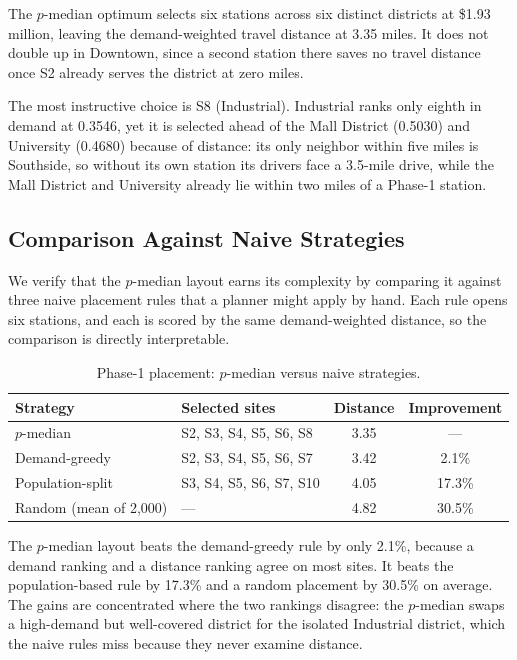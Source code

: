 \documentclass[11pt]{article}
\begin{document}
The $p$-median optimum selects six stations across six distinct districts at \$1.93 million, leaving the demand-weighted travel distance at 3.35 miles. It does not double up in Downtown, since a second station there saves no travel distance once S2 already serves the district at zero miles.

The most instructive choice is S8 (Industrial). Industrial ranks only eighth in demand at 0.3546, yet it is selected ahead of the Mall District (0.5030) and University (0.4680) because of distance: its only neighbor within five miles is Southside, so without its own station its drivers face a 3.5-mile drive, while the Mall District and University already lie within two miles of a Phase-1 station.

\subsection{Comparison Against Naive Strategies}

We verify that the $p$-median layout earns its complexity by comparing it against three naive placement rules that a planner might apply by hand. Each rule opens six stations, and each is scored by the same demand-weighted distance, so the comparison is directly interpretable.

\begin{table}[H]
\centering
\caption{Phase-1 placement: $p$-median versus naive strategies.}
\label{tab:naive}
\begin{tabular}{llcc}
\toprule
Strategy & Selected sites & Distance & Improvement \\
\midrule
$p$-median & S2, S3, S4, S5, S6, S8 & 3.35 & --- \\
Demand-greedy & S2, S3, S4, S5, S6, S7 & 3.42 & 2.1\% \\
Population-split & S3, S4, S5, S6, S7, S10 & 4.05 & 17.3\% \\
Random (mean of 2{,}000) & --- & 4.82 & 30.5\% \\
\bottomrule
\end{tabular}
\end{table}

The $p$-median layout beats the demand-greedy rule by only 2.1\%, because a demand ranking and a distance ranking agree on most sites. It beats the population-based rule by 17.3\% and a random placement by 30.5\% on average. The gains are concentrated where the two rankings disagree: the $p$-median swaps a high-demand but well-covered district for the isolated Industrial district, which the naive rules miss because they never examine distance.
\end{document}
